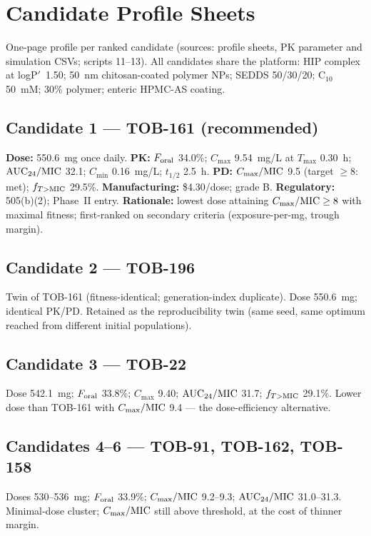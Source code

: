 \chapter{Candidate Profile Sheets}
\label{chap:app-candidates}

One-page profile per ranked candidate (sources:  profile sheets, PK parameter and simulation CSVs; scripts 11--13). All candidates share the platform: HIP complex at logP$'$~1.50; 50~nm chitosan-coated polymer NPs; SEDDS 50/30/20; C$_{10}$ 50~mM; 30\% polymer; enteric HPMC-AS coating.

\section*{Candidate 1 --- TOB-161 (recommended)}
\textbf{Dose:} 550.6~mg once daily. \textbf{PK:} $F_{\mathrm{oral}}$ 34.0\%; $C_{\max}$ 9.54~mg/L at $T_{\max}$ 0.30~h; $\mathrm{AUC}_{24}/\mathrm{MIC}$ 32.1; $C_{\min}$ 0.16~mg/L; $t_{1/2}$ 2.5~h. \textbf{PD:} $C_{\max}/\mathrm{MIC}$ 9.5 (target $\geq$8: met); $f_{T>\mathrm{MIC}}$ 29.5\%. \textbf{Manufacturing:} \$4.30/dose; grade B. \textbf{Regulatory:} 505(b)(2); Phase~II entry. \textbf{Rationale:} lowest dose attaining $C_{\max}/\mathrm{MIC} \geq 8$ with maximal fitness; first-ranked on secondary criteria (exposure-per-mg, trough margin).

\section*{Candidate 2 --- TOB-196}
Twin of TOB-161 (fitness-identical; generation-index duplicate). Dose 550.6~mg; identical PK/PD. Retained as the reproducibility twin (same seed, same optimum reached from different initial populations).

\section*{Candidate 3 --- TOB-22}
Dose 542.1~mg; $F_{\mathrm{oral}}$ 33.8\%; $C_{\max}$ 9.40; $\mathrm{AUC}_{24}/\mathrm{MIC}$ 31.7; $f_{T>\mathrm{MIC}}$ 29.1\%. Lower dose than TOB-161 with $C_{\max}/\mathrm{MIC}$ 9.4 --- the dose-efficiency alternative.

\section*{Candidates 4--6 --- TOB-91, TOB-162, TOB-158}
Doses 530--536~mg; $F_{\mathrm{oral}}$ 33.9\%; $C_{\max}/\mathrm{MIC}$ 9.2--9.3; $\mathrm{AUC}_{24}/\mathrm{MIC}$ 31.0--31.3. Minimal-dose cluster; $C_{\max}/\mathrm{MIC}$ still above threshold, at the cost of thinner margin.

